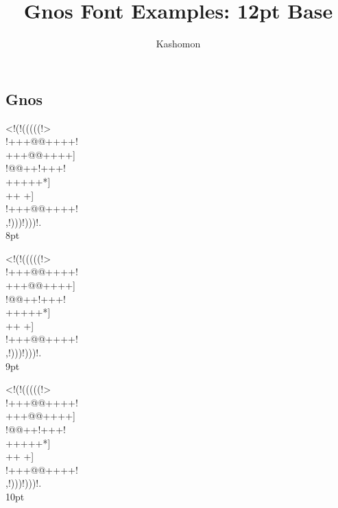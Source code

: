 \documentclass[12pt]{article}
\begin{document}
\title{Gnos Font Examples: 12pt Base}
\author{Kashomon}
\maketitle

\begin{center}
\section*{Gnos}
{
\gnos%
<!(!(((((!>\\
!+++@@++++!\\
+++@@++++]\\
!@@++!+++!\\
+++++*]\\
++
+]\\
!+++@@++++!\\
,!)))!)))!.\\
}
8pt

{
\gnos%
<!(!(((((!>\\
!+++@@++++!\\
+++@@++++]\\
!@@++!+++!\\
+++++*]\\
++
+]\\
!+++@@++++!\\
,!)))!)))!.\\
}
9pt


{
\gnos%
<!(!(((((!>\\
!+++@@++++!\\
+++@@++++]\\
!@@++!+++!\\
+++++*]\\
++
+]\\
!+++@@++++!\\
,!)))!)))!.\\
}
10pt

\newpage


\end{center}
\end{document}
